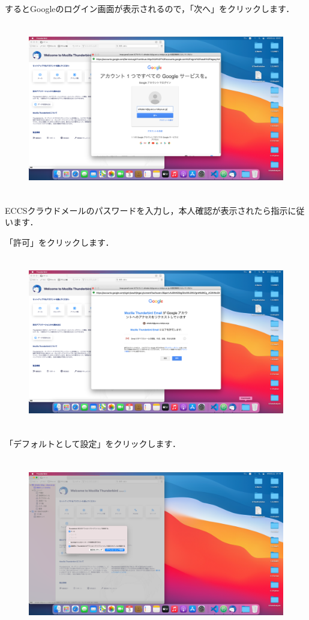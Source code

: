 \documentclass{jarticle}
\begin{document}
するとGoogleのログイン画面が表示されるので，「次へ」をクリックします．
\begin{figure}[H]
  \centering
  \includegraphics[height=7.5cm]{fig/MacThunderbird3.png}
\end{figure}

ECCSクラウドメールのパスワードを入力し，本人確認が表示されたら指示に従います．

\newpage
「許可」をクリックします．
\begin{figure}[H]
  \centering
  \includegraphics[height=7.5cm]{fig/MacThunderbird4.png}
\end{figure}

「デフォルトとして設定」をクリックします．
\begin{figure}[H]
  \centering
  \includegraphics[height=7.5cm]{fig/MacThunderbird5.png}
\end{figure}
\end{document}
